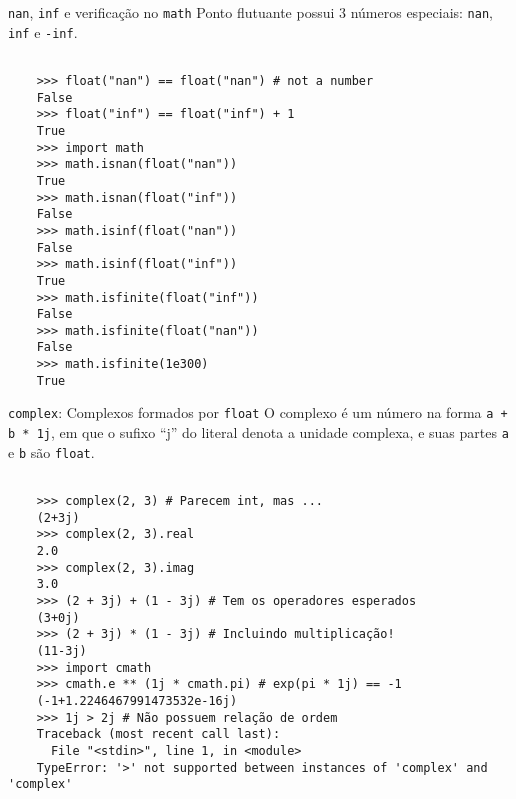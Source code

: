 \documentclass[utf8]{beamer}
\begin{document}
\begin{frame}[fragile]{\texttt{nan}, \texttt{inf} e
                       verificação no \texttt{math}}
  Ponto flutuante possui $3$ números especiais:
  \texttt{nan},
  \texttt{inf} e
  \texttt{-inf}.

  \begin{verbatim}

    >>> float("nan") == float("nan") # not a number
    False
    >>> float("inf") == float("inf") + 1
    True
    >>> import math
    >>> math.isnan(float("nan"))
    True
    >>> math.isnan(float("inf"))
    False
    >>> math.isinf(float("nan"))
    False
    >>> math.isinf(float("inf"))
    True
    >>> math.isfinite(float("inf"))
    False
    >>> math.isfinite(float("nan"))
    False
    >>> math.isfinite(1e300)
    True

  \end{verbatim}
\end{frame}


\begin{frame}[fragile]{\texttt{complex}:
                       Complexos formados por \texttt{float}}
  O complexo é um número na forma \texttt{a + b * 1j},
  em que o sufixo ``j'' do literal denota a unidade complexa,
  e suas partes \texttt{a} e \texttt{b}
  são \texttt{float}.

  \begin{verbatim}

    >>> complex(2, 3) # Parecem int, mas ...
    (2+3j)
    >>> complex(2, 3).real
    2.0
    >>> complex(2, 3).imag
    3.0
    >>> (2 + 3j) + (1 - 3j) # Tem os operadores esperados
    (3+0j)
    >>> (2 + 3j) * (1 - 3j) # Incluindo multiplicação!
    (11-3j)
    >>> import cmath
    >>> cmath.e ** (1j * cmath.pi) # exp(pi * 1j) == -1
    (-1+1.2246467991473532e-16j)
    >>> 1j > 2j # Não possuem relação de ordem
    Traceback (most recent call last):
      File "<stdin>", line 1, in <module>
    TypeError: '>' not supported between instances of 'complex' and 'complex'

  \end{verbatim}

\end{frame}
\end{document}

